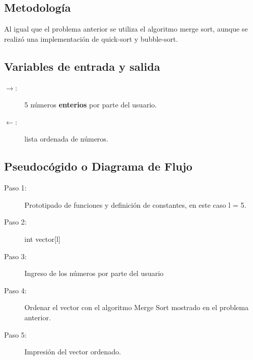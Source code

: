\subsection{Metodología}
Al igual que el problema anterior se utiliza el algoritmo merge sort, aunque se realizó una implementación de quick-sort y bubble-sort.

\subsection{Variables de entrada y salida}
\begin{description}
	\item[$\rightarrow$: ] 5 números \textbf{enterios} por parte del usuario.
	\item[$\leftarrow$: ] lista ordenada de números. 
\end{description}

\subsection{Pseudocógido o Diagrama de Flujo}
\begin{description}
	\item[Paso 1: ] Prototipado de funciones y definición de constantes, en este caso l = 5.
	\item[Paso 2: ] int vector[l]
	\item[Paso 3: ] Ingreso de los números por parte del usuario
	\item[Paso 4: ] Ordenar el vector con el algoritmo Merge Sort mostrado en el problema anterior.
	\item[Paso 5: ] Impresión del vector ordenado.
\end{description}

